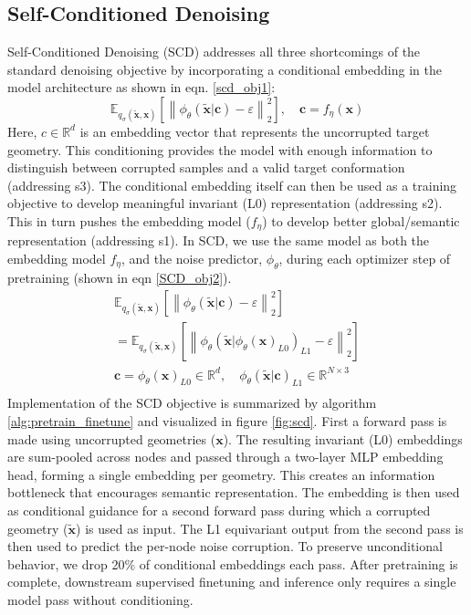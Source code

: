 \documentclass{article}
\theoremstyle{plain}
\theoremstyle{definition}
\theoremstyle{remark}
\begin{document}
\subsection{Self-Conditioned Denoising}
Self-Conditioned Denoising (SCD) addresses all three shortcomings of the standard denoising objective by incorporating a conditional embedding in the model architecture as shown in eqn. \ref{scd_obj1}:
\begin{equation}\label{scd_obj1}
\mathbb{E}_{q_{\sigma}(\tilde{\mathbf{x}}, \mathbf{x})}
\left[
  \left\lVert
    \phi_{\theta}(\tilde{\mathbf{x}}|\mathbf{c}) - \varepsilon
  \right\rVert_{2}^{2}
\right], \quad
\mathbf{c} = f_{\eta}(\mathbf{x})
\end{equation}
Here, $c \in  \mathbb{R}^{d}$ is an embedding vector that represents the uncorrupted target geometry. This conditioning provides the model with enough information to distinguish between corrupted samples and a valid target conformation (addressing s3). The conditional embedding itself can then be used as a training objective to develop meaningful invariant (L0) representation (addressing s2). This in turn pushes the embedding model ($f_{\eta}$) to develop better global/semantic representation (addressing s1). In SCD, we use the same model as both the embedding model $f_{\eta}$, and the noise predictor, $\phi_{\theta}$, during each optimizer step of pretraining (shown in eqn \ref{SCD_obj2}).
\begin{equation}\label{SCD_obj2}
\begin{aligned}
\mathbb{E}_{q_{\sigma}(\tilde{\mathbf{x}}, \mathbf{x})}
\left[
  \left\lVert
    \phi_{\theta}(\tilde{\mathbf{x}}|\mathbf{c}) - \varepsilon
  \right\rVert_{2}^{2}
\right]\\[1ex]
=
\mathbb{E}_{q_{\sigma}(\tilde{\mathbf{x}}, \mathbf{x})}
\left[
  \left\lVert
    \phi_{\theta}(\tilde{\mathbf{x}}|\phi_{\theta}(\mathbf{x})_{L0})_{L1} - \varepsilon
  \right\rVert_{2}^{2}
\right]\\[2ex]
\mathbf{c} = \phi_{\theta}(\mathbf{x})_{L0} \in \mathbb{R}^d, \quad
\phi_{\theta}(\tilde{\mathbf{x}}|\mathbf{c})_{L1} \in \mathbb{R}^{N\times3}\\
\end{aligned}
\end{equation}
Implementation of the SCD objective is summarized by algorithm \ref{alg:pretrain_finetune} and visualized in figure \ref{fig:scd}. First a forward pass is made using uncorrupted geometries ($\mathbf{x}$). The resulting invariant (L0) embeddings are sum-pooled across nodes and passed through a two-layer MLP embedding head, forming a single embedding per geometry. This creates an information bottleneck that encourages semantic representation. The embedding is then used as conditional guidance for a second forward pass during which a corrupted geometry ($\tilde{\mathbf{x}}$) is used as input. The L1 equivariant output from the second pass is then used to predict the per-node noise corruption. To preserve unconditional behavior, we drop 20\% of conditional embeddings each pass. After pretraining is complete, downstream supervised finetuning and inference only requires a single model pass without conditioning. 
\end{document}

